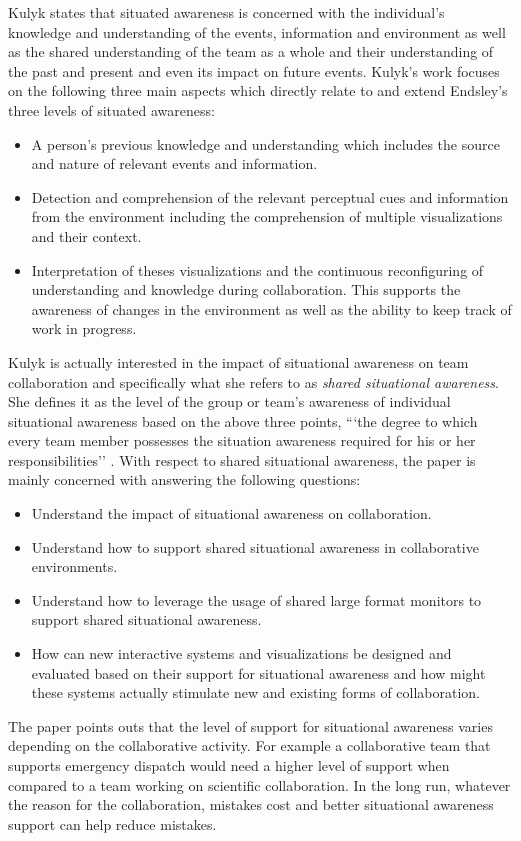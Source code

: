 \documentclass{sig-alternate}
\begin{document}
 
Kulyk states that situated awareness is concerned with the individual's
knowledge and understanding of the events, information and environment as well
as the shared understanding of the team as a whole and their understanding of
the past and present and even its impact on future events. Kulyk's work focuses
on the following three main aspects which directly relate to and extend
Endsley's \cite{Endsley:1988:DesignEvaluationSituationAwarenessEnhancement} three levels of situated awareness:
\begin{itemize}
\item A person's previous knowledge and understanding which includes the
source and nature of relevant events and information.
\item Detection and comprehension of the relevant perceptual cues and
information from the environment including the comprehension of multiple
visualizations and their context.
\item Interpretation of theses visualizations and the continuous reconfiguring
of understanding and knowledge during collaboration. This supports the
awareness of changes in the environment as well as the ability to keep track
of work in progress.\end{itemize} Kulyk is actually interested in the impact
of situational awareness on team collaboration and specifically what she
refers to as \emph{shared situational awareness}. She defines it as the level
of the group or team's awareness of individual situational awareness based
on the above three points, ```the degree to which every team member possesses the
situation awareness required for his or her responsibilities'' \cite{Endsley:2000:SituationAwarenessAircraftMaintenance}. With
respect to shared situational awareness, the paper is mainly concerned with
answering the following questions:
\begin{itemize}
\item Understand the impact of situational awareness on
collaboration.
\item Understand how to support shared situational awareness in collaborative
environments.
\item Understand how to leverage the usage of shared large format monitors to
support shared situational awareness.
\item How can new interactive systems and visualizations be designed and
evaluated based on their support for situational awareness and how might these
systems actually stimulate new and existing forms of collaboration.
\end{itemize}
The paper points outs that the level of support for situational awareness
varies depending on the collaborative activity. For example a collaborative team
that supports emergency dispatch would need a higher level of support when
compared to a team working on scientific collaboration. In the long run,
whatever the reason for the collaboration, mistakes cost and better situational
awareness support can help reduce mistakes.
\end{document}

